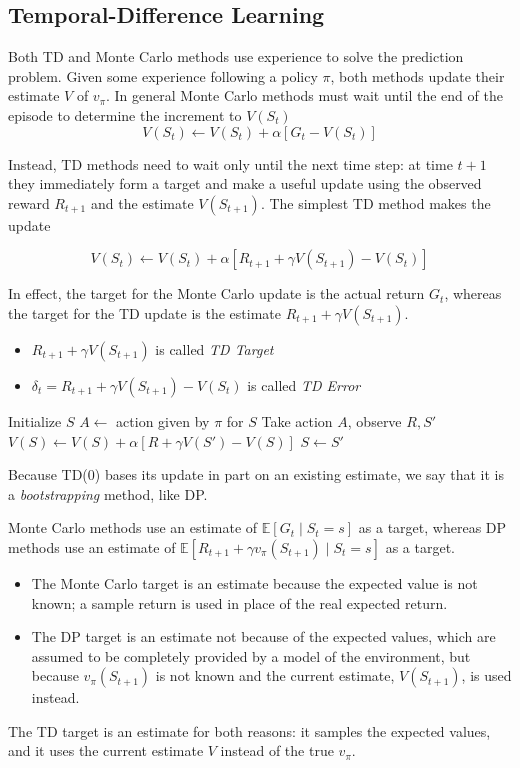 \subsection{Temporal-Difference Learning}
Both TD and Monte Carlo methods use experience to solve the prediction problem. Given some experience following a policy $\pi$, both methods update their estimate $V$ of $v_\pi$. In general Monte Carlo methods
must wait until the end of the episode to determine the increment to $V(S_t)$
\[
    V(S_t) \gets V(S_t) + \alpha \left[ G_t - V(S_t) \right]
\]

Instead, TD methods need to wait only until the next time step: at time $t + 1$ they immediately form a target and make a useful update using the observed reward $R_{t+1}$ and the estimate $V (S_{t+1})$. The simplest TD method makes the update

\[
    V(S_t) \gets V(S_t) + \alpha [R_{t+1} + \gamma V(S_{t+1}) - V(S_t)]
\]

In effect, the target for the Monte Carlo update is the actual return $G_t$, whereas the target for the TD update is the estimate $R_{t+1} + \gamma V(S_{t+1})$.
\begin{itemize}
    \item $R_{t+1} + \gamma V(S_{t+1})$ is called \emph{TD Target}
    \item $\delta_t = R_{t+1} + \gamma V(S_{t+1}) - V(S_t)$ is called \emph{TD Error}
\end{itemize}

\begin{algorithm}
    \caption{Tabular TD(0) for estimating $v_\pi$}
    \begin{algorithmic}[1]
            \State Initialize $S$
                \State $A \gets$ action given by $\pi$ for $S$
                \State Take action $A$, observe $R, S'$
                \State $V(S) \gets V(S) + \alpha [R + \gamma V(S') - V(S)]$
                \State $S \gets S'$
            \EndFor
        \EndFor
    \end{algorithmic}
\end{algorithm}

Because TD(0) bases its update in part on an existing estimate, we say that it is a \emph{bootstrapping} method, like DP.

Monte Carlo methods use an estimate of $\mathbb{E}[G_t \mid S_t = s]$ as a target, whereas DP methods use an estimate of $\mathbb{E}[R_{t+1}+\gamma v_\pi(S_{t+1}) \mid S_t = s]$ as a target.
\begin{itemize}
    \item The Monte Carlo target is an estimate because the expected value is not known; a sample return is used in place of the real expected return.
    \item The DP target is an estimate not because of the expected values, which are assumed to be completely provided by a model of the environment, but because $v_\pi(S_{t+1})$ is not known and the current estimate, $V(S_{t+1})$, is used instead. 
\end{itemize}
The TD target is an estimate for both reasons: it samples the expected values, and it uses the current estimate $V$ instead of the true $v_\pi$.

